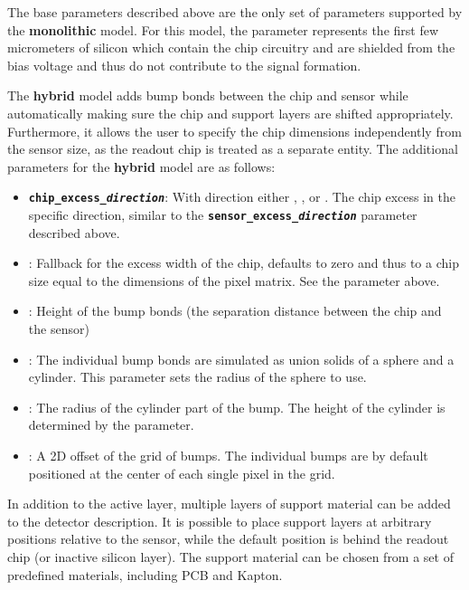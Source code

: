 The base parameters described above are the only set of parameters supported by the \textbf{monolithic} model. For this model, the  parameter represents the first few micrometers of silicon which contain the chip circuitry and are shielded from the bias voltage and thus do not contribute to the signal formation.

The \textbf{hybrid} model adds bump bonds between the chip and sensor while automatically making sure the chip and support layers are shifted appropriately.
Furthermore, it allows the user to specify the chip dimensions independently from the sensor size, as the readout chip is treated as a separate entity.
The additional parameters for the \textbf{hybrid} model are as follows:
\begin{itemize}
\item \texttt{\textbf{chip\_excess\_\textit{direction}}}: With direction either , ,  or .
The chip excess in the specific direction, similar to the \texttt{\textbf{sensor\_excess\_\textit{direction}}} parameter described above.
\item {}: Fallback for the excess width of the chip, defaults to zero and thus to a chip size equal to the dimensions of the pixel matrix.
See the  parameter above.
\item {}: Height of the bump bonds (the separation distance between the chip and the sensor)
\item {}: The individual bump bonds are simulated as union solids of a sphere and a cylinder.
This parameter sets the radius of the sphere to use.
\item {}: The radius of the cylinder part of the bump.
The height of the cylinder is determined by the  parameter.
\item {}: A 2D offset of the grid of bumps.
The individual bumps are by default positioned at the center of each single pixel in the grid.
\end{itemize}


\label{sec:support_layers}
In addition to the active layer, multiple layers of support material can be added to the detector description.
It is possible to place support layers at arbitrary positions relative to the sensor, while the default position is behind the readout chip (or inactive silicon layer).
The support material can be chosen from a set of predefined materials, including PCB and Kapton.

